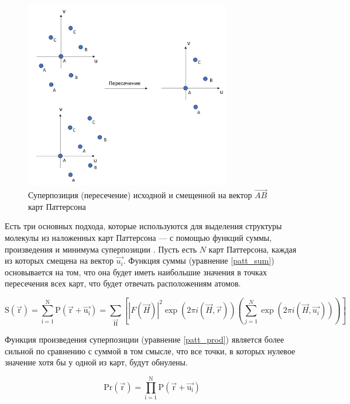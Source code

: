 \begin{figure}[H]
	\centering
	\includegraphics[width=0.8\textwidth]{figures/patt_superposition.png}\hfill
	\caption{Суперпозиция (пересечение) исходной и смещенной на вектор $\overrightarrow{AB}$ карт Паттерсона}
	\label{patt_superposition}
\end{figure}

Есть три основных подхода, которые используются для выделения структуры молекулы из наложенных карт Паттерсона --- с помощью функций суммы, произведения и минимума суперпозиции \cite{rossmann_patterson_2001}. Пусть есть $N$ карт Паттерсона, каждая из которых смещена на вектор $\overrightarrow{u_i}$. Функция суммы (уравнение \ref{patt_sum}) основывается на том, что она будет иметь наибольшие значения в точках пересечения всех карт, что будет отвечать расположениям атомов.

\begin{equation}\label{patt_sum}
	\mathrm{S(\overrightarrow{r}) = \sum\limits_{i=1}^N P(\overrightarrow{r}+\overrightarrow{u_i}) = \sum_{\overrightarrow{H}}}\left[|F(\overrightarrow{H})|^2 \exp (2\pi i (\overrightarrow{H}, \overrightarrow{r}))\left(\sum\limits_{j=1}^N\exp(2\pi i (\overrightarrow{H}, \overrightarrow{u_i}))\right)\right]
\end{equation}

Функция произведения суперпозиции (уравнение \ref{patt_prod}) является более сильной по сравнению с суммой в том смысле, что все точки, в которых нулевое значение хотя бы у одной из карт, будут обнулены.

\begin{equation}\label{patt_prod}
	\mathrm{Pr(\overrightarrow{r}) = \prod\limits_{i=1}^N P(\overrightarrow{r}+\overrightarrow{u_i})} 
\end{equation}
	
